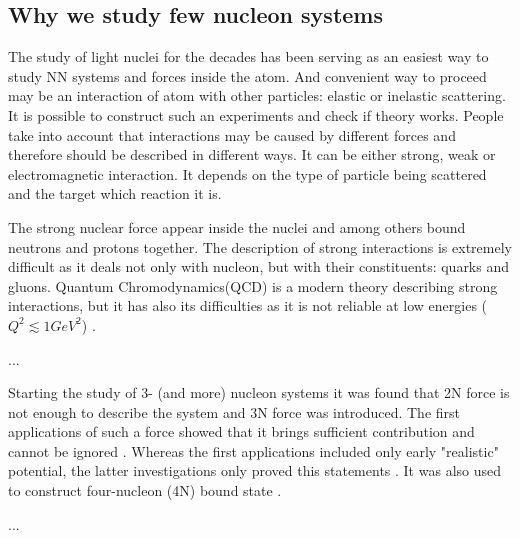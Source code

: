 \subsection*{Why we study few nucleon systems}

The study of light nuclei for the decades has been serving as an easiest way
to study NN systems and forces inside the atom. And
convenient way to proceed may be an interaction of atom with
other particles: elastic or inelastic scattering.
It is possible to construct such an experiments and check if theory works.
People take into account that interactions may be caused by different forces
and therefore should be described in different ways. It can be
either strong, weak or electromagnetic interaction. It depends
on the type of particle being scattered and the target which reaction it is.



The strong nuclear force appear inside the nuclei and among others bound neutrons 
and protons together. The description of strong interactions is extremely
difficult as it deals not only with nucleon, but with their constituents: quarks
and gluons. Quantum Chromodynamics(QCD) is a modern theory
describing strong interactions, but it has also its difficulties
as it is not reliable at low energies ($Q^2 \lesssim 1 GeV^2$) \cite{IOFFE2006232}.

...  

Starting the study of 3- (and more) nucleon systems it was found that 2N force is not enough to describe
the system and 3N force was introduced. The first applications of such
a force showed that it brings sufficient contribution and cannot be ignored \cite{GLOCKLE1982343}.
Whereas the first applications included only early "realistic" potential, the latter
investigations only proved this statements \cite{StoksPhysRevC49, WIRINGAPhysRevC51}.
It was also used to construct four-nucleon (4N) bound state \cite{NoggaPhysRevLett}.

...

